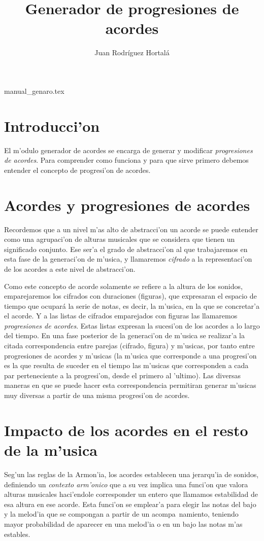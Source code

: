 ﻿manual_genaro.tex\documentclass[a4paper,12pt]{article}
\author{Juan Rodr\'iguez Hortal\'a}
\title{Generador de progresiones de acordes}
\begin{document}
\maketitle
\tableofcontents
\section{Introducci'on}
El m'odulo generador de acordes se encarga de generar y modificar \emph{progresiones de acordes}. Para comprender como funciona y para que sirve primero debemos entender el concepto de progresi'on de acordes.

\section {Acordes y progresiones de acordes} 

Recordemos que a un nivel m'as alto de abstracci'on un acorde se puede entender como una agrupaci'on de alturas musicales que se considera que tienen un significado conjunto. Ese ser'a el grado de abstracci'on al que trabajaremos en esta fase de la generaci'on de m'usica, y llamaremos \emph{cifrado} a la representaci'on de los acordes a este nivel de abstracci'on. 

Como este concepto de acorde solamente se refiere a la altura de los sonidos, emparejaremos los cifrados con duraciones (figuras), que expresaran el espacio de tiempo que ocupará la serie de notas, es decir, la m'usica, en la que se concretar'a el acorde. Y a las listas de cifrados emparejados con figuras las llamaremos \emph{progresiones de acordes}. Estas listas expresan la sucesi'on de los acordes a lo largo del tiempo. En una fase posterior de la generaci'on de m'usica se realizar'a la citada correspondencia entre parejas (cifrado, figura) y m'usicas, por tanto entre progresiones de acordes y m'usicas (la m'usica que corresponde a una progresi'on es la que resulta de suceder en el tiempo las m'usicas que corresponden a cada par perteneciente a la progresi'on, desde el primero al 'ultimo). Las diversas maneras en que se puede hacer esta correspondencia permitiran generar m'usicas muy diversas a partir de una misma progresi'on de acordes.

\section {Impacto de los acordes en el resto de la m'usica}
Seg'un las reglas de la Armon'ia, los acordes establecen una jerarqu'ia de sonidos, definiendo un \emph{contexto arm'onico} que a su vez implica una funci'on que valora alturas musicales haci'endole corresponder un entero que llamamos estabilidad de esa altura en ese acorde. Esta funci'on se emplear'a para elegir las notas del bajo y la melod'ia que se compongan a partir de un acompa~namiento, teniendo mayor probabilidad de aparecer en una melod'ia o en un bajo las notas m'as estables.
\end{document}
